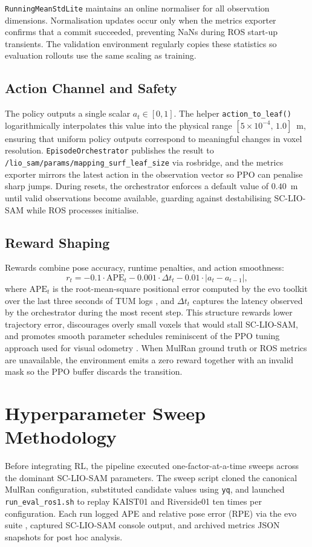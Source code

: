 \texttt{RunningMeanStdLite} maintains an online normaliser for all observation dimensions. Normalisation updates occur only when the metrics exporter confirms that a commit succeeded, preventing NaNs during ROS start-up transients. The validation environment regularly copies these statistics so evaluation rollouts use the same scaling as training.

\subsection{Action Channel and Safety}
The policy outputs a single scalar $a_t \in [0,1]$. The helper \texttt{action\_to\_leaf()} logarithmically interpolates this value into the physical range $[5\times10^{-4},\,1.0]$~m, ensuring that uniform policy outputs correspond to meaningful changes in voxel resolution. \texttt{EpisodeOrchestrator} publishes the result to \texttt{/lio\_sam/params/mapping\_surf\_leaf\_size} via rosbridge, and the metrics exporter mirrors the latest action in the observation vector so PPO can penalise sharp jumps. During resets, the orchestrator enforces a default value of $0.40$~m until valid observations become available, guarding against destabilising SC-LIO-SAM while ROS processes initialise.

\subsection{Reward Shaping}
Rewards combine pose accuracy, runtime penalties, and action smoothness:
\begin{equation}
  r_t = -0.1 \cdot \text{APE}_t - 0.001 \cdot \Delta t_t - 0.01 \cdot \lvert a_t - a_{t-1} \rvert,
\end{equation}
where $\text{APE}_t$ is the root-mean-square positional error computed by the evo toolkit over the last three seconds of TUM logs \cite{grupp2017evo}, and $\Delta t_t$ captures the latency observed by the orchestrator during the most recent step. This structure rewards lower trajectory error, discourages overly small voxels that would stall SC-LIO-SAM, and promotes smooth parameter schedules reminiscent of the PPO tuning approach used for visual odometry \cite{nicomessikommer_2024_reinforcement}. When MulRan ground truth or ROS metrics are unavailable, the environment emits a zero reward together with an invalid mask so the PPO buffer discards the transition.

\section{Hyperparameter Sweep Methodology}
Before integrating RL, the pipeline executed one-factor-at-a-time sweeps across the dominant SC-LIO-SAM parameters. The sweep script cloned the canonical MulRan configuration, substituted candidate values using \texttt{yq}, and launched \texttt{run\_eval\_ros1.sh} to replay KAIST01 and Riverside01 ten times per configuration. Each run logged APE and relative pose error (RPE) via the evo suite \cite{grupp2017evo}, captured SC-LIO-SAM console output, and archived metrics JSON snapshots for post hoc analysis.


